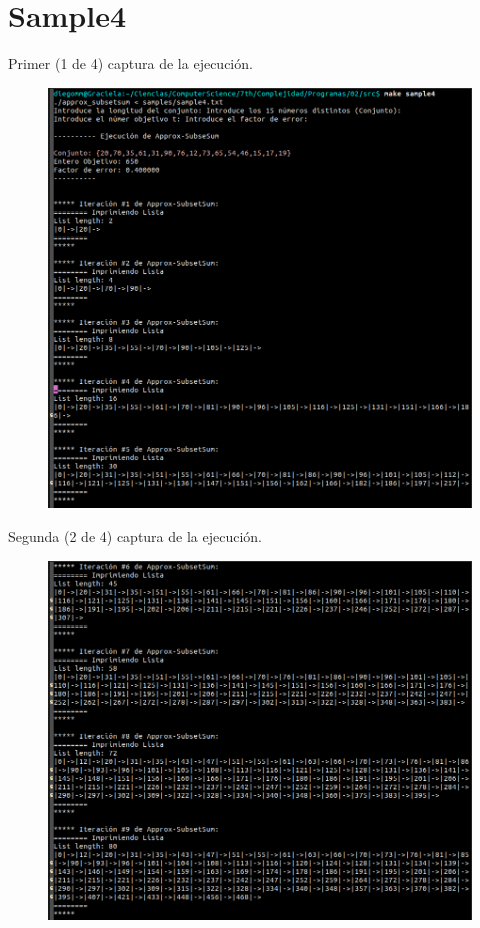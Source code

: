 \documentclass[14pt,letterpaper]{article}
\begin{document}
  \section {\sc Sample4}
    Primer (1 de 4) captura de la ejecución.
  \begin{figure}[h]
    \includegraphics[width=15cm]{sample4_1.png}
    \centering
  \end{figure}
  \clearpage
  Segunda (2 de 4) captura de la ejecución.
  \begin{figure}[h]
    \includegraphics[width=15cm]{sample4_2.png}
    \centering
  \end{figure}
\end{document}
